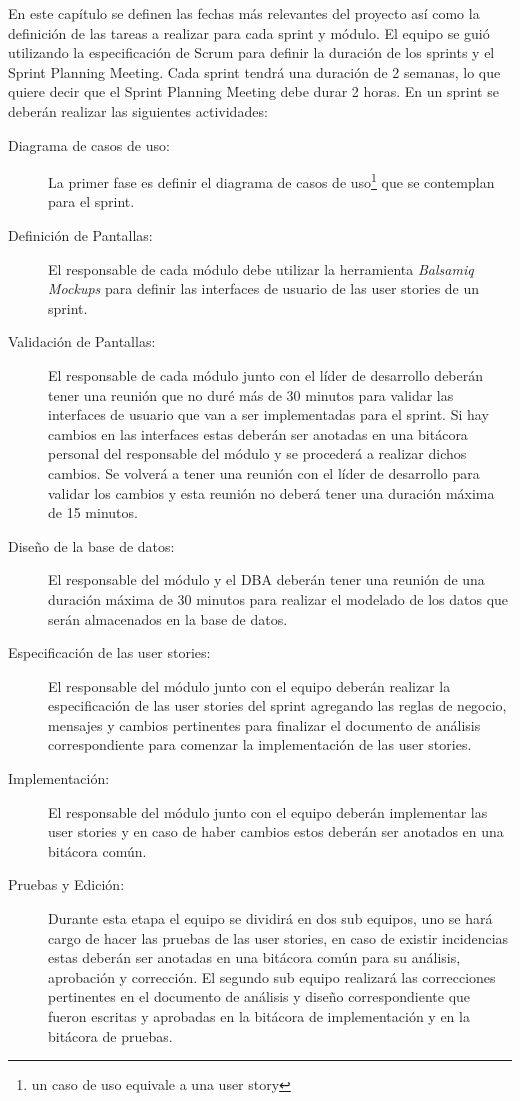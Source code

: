En este capítulo se definen las fechas más relevantes del proyecto así como la definición de las tareas a realizar para cada sprint y módulo. El equipo se guió utilizando la especificación de Scrum para definir la duración de los sprints y el Sprint Planning Meeting. Cada sprint tendrá una duración de 2 semanas, lo que quiere decir que el Sprint Planning Meeting debe durar 2 horas. En un sprint se deberán realizar las siguientes actividades:
			\begin{description}
				\item[Diagrama de casos de uso:] La primer fase es definir el diagrama de casos de uso\footnote{un caso de uso equivale a una user story} que se contemplan para el sprint.
				\item[Definición de Pantallas:] El responsable de cada módulo debe utilizar la herramienta \textit{Balsamiq Mockups} para definir las interfaces de usuario de las user stories de un sprint.
				\item[Validación de Pantallas:] El responsable de cada módulo junto con el líder de desarrollo deberán tener una reunión que no duré más de 30 minutos para validar las interfaces de usuario que van a ser implementadas para el sprint. Si hay cambios en las interfaces estas deberán ser anotadas en una bitácora personal del responsable del módulo y se procederá a realizar dichos cambios. Se volverá a tener una reunión con el líder de desarrollo para validar los cambios y esta reunión no deberá tener una duración máxima de 15 minutos.
				\item[Diseño de la base de datos:] El responsable del módulo y el DBA deberán tener una reunión de una duración máxima de 30 minutos para realizar el modelado de los datos que serán almacenados en la base de datos.
				\item[Especificación de las user stories:] El responsable del módulo junto con el equipo deberán realizar la especificación de las user stories del sprint agregando las reglas de negocio, mensajes y cambios pertinentes para finalizar el documento de análisis correspondiente para comenzar la implementación de las user stories.
				\item[Implementación:] El responsable del módulo junto con el equipo deberán implementar las user stories y en caso de haber cambios estos deberán ser anotados en una bitácora común.
				\item[Pruebas y Edición:] Durante esta etapa el equipo se dividirá en dos sub equipos, uno se hará cargo de hacer las pruebas de las user stories, en caso de existir incidencias estas deberán ser anotadas en una bitácora común para su análisis, aprobación y corrección. El segundo sub equipo realizará las correcciones pertinentes en el documento de análisis y diseño correspondiente que fueron escritas y aprobadas en la bitácora de implementación y en la bitácora de pruebas.

\end{description}
